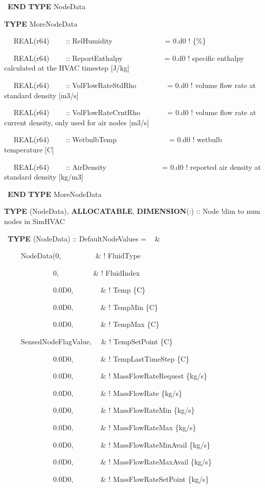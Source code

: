 ~\textbf{END} \textbf{TYPE} NodeData

\textbf{TYPE} MoreNodeData

~~ REAL(r64)~~~~ :: RelHumidity~~~~~~~~~~~~~~ = 0.d0 ! \{\%\}

~~ REAL(r64)~~~~ :: ReportEnthalpy~~~~~~~~~~~ = 0.d0 ! specific enthalpy calculated at the HVAC timestep {[}J/kg{]}

~~ REAL(r64)~~~~ :: VolFlowRateStdRho~~~~~~~~ = 0.d0 ! volume flow rate at standard density {[}m3/s{]}

~~ REAL(r64)~~~~ :: VolFlowRateCrntRho~~~~~~~ = 0.d0 ! volume flow rate at current density, only used for air nodes {[}m3/s{]}

~~ REAL(r64)~~~~ :: WetbulbTemp~~~~~~~~~~~~~~ = 0.d0 ! wetbulb temperature {[}C{]}

~~ REAL(r64)~~~~ :: AirDensity~~~~~~~~~~~~~~~ = 0.d0 ! reported air density at standard density {[}kg/m3{]}

~\textbf{END} \textbf{TYPE} MoreNodeData

\textbf{TYPE} (NodeData), \textbf{ALLOCATABLE}, \textbf{DIMENSION}(:) :: Node !dim to num nodes in SimHVAC

~\textbf{TYPE} (NodeData) :: DefaultNodeValues = ~ \&

~~~~ NodeData(0, ~~~~~~~~~\& ! FluidType

~~~~~~~~~~~~~ 0,~~~~~~~~~ \& ! FluidIndex

~~~~~~~~~~~~~ 0.0D0,~~~~~~~ \& ! Temp \{C\}

~~~~~~~~~~~~~ 0.0D0,~~~~~~~ \& ! TempMin \{C\}

~~~~~~~~~~~~~ 0.0D0,~~~~~~~ \& ! TempMax \{C\}

~~~~ SensedNodeFlagValue,~~ \& ! TempSetPoint \{C\}

~~~~~~~~~~~~~ 0.0D0,~~~~~~~ \& ! TempLastTimeStep \{C\}

~~~~~~~~~~~~~ 0.0D0,~~~~~~~ \& ! MassFlowRateRequest \{kg/s\}

~~~~~~~~~~~~~ 0.0D0,~~~~~~~ \& ! MassFlowRate \{kg/s\}

~~~~~~~~~~~~~ 0.0D0,~~~~~~~ \& ! MassFlowRateMin \{kg/s\}

~~~~~~~~~~~~~ 0.0D0,~~~~~~~ \& ! MassFlowRateMax \{kg/s\}

~~~~~~~~~~~~~ 0.0D0,~~~~~~~ \& ! MassFlowRateMinAvail \{kg/s\}

~~~~~~~~~~~~~ 0.0D0,~~~~~~~ \& ! MassFlowRateMaxAvail \{kg/s\}

~~~~~~~~~~~~~ 0.0D0,~~~~~~~ \& ! MassFlowRateSetPoint \{kg/s\}

